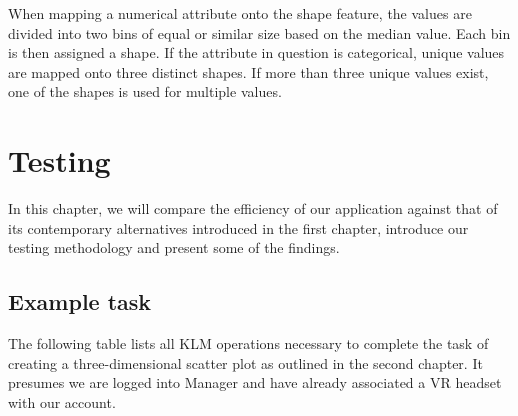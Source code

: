 \documentclass[thesis=M,english,hidelinks]{FITthesisXE}[2012/06/26]
\begin{document}
When mapping a numerical attribute onto the shape feature, the values are divided into two bins of equal or similar size based on the median value. Each bin is then assigned a shape. If the attribute in question is categorical, unique values are mapped onto three distinct shapes. If more than three unique values exist, one of the shapes is used for multiple values.

\chapter{Testing}

In this chapter, we will compare the efficiency of our application against that of its contemporary alternatives introduced in the first chapter, introduce our testing methodology and present some of the findings.

\section{Example task}

The following table lists all KLM operations necessary to complete the task of creating a three-dimensional scatter plot as outlined in the second chapter. It presumes we are logged into Manager and have already associated a VR headset with our account.
\end{document}
